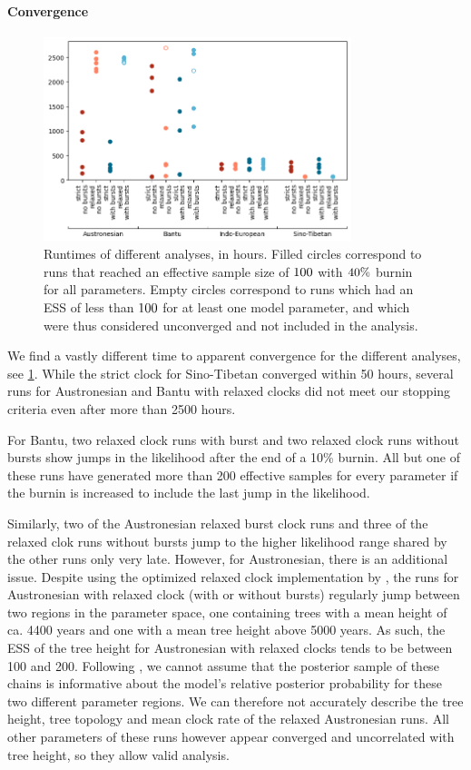 \documentclass[]{rsos}%
\begin{document}
\paragraph{Convergence}
\begin{figure}
  \centering
  \includegraphics[width=0.8\textwidth]{supplement/analysis/runtimes.png}
  \caption{Runtimes of different analyses, in hours. Filled circles correspond to runs that reached an effective sample size of $100$ with $40\%$ burnin for all parameters. Empty circles correspond to runs which had an ESS of less than $100$ for at least one model parameter, and which were thus considered unconverged and not included in the analysis.}\label{f:runtimes}
\end{figure}
We find a vastly different time to apparent convergence for the different
analyses, see \cref{f:runtimes}. While the strict clock for Sino-Tibetan converged within 50 hours,
several runs for Austronesian and Bantu with relaxed clocks did not meet our
stopping criteria even after more than 2500 hours.

For Bantu, two relaxed clock runs with burst and two relaxed clock runs without
bursts show jumps in the likelihood after the end of a 10\% burnin. All but one
of these runs have generated more than 200 effective samples for every parameter
if the burnin is increased to include the last jump in the likelihood.

Similarly, two of the Austronesian relaxed burst clock runs and three of the
relaxed clok runs without bursts jump to the higher likelihood range
shared by the other runs only very late.
However, for Austronesian, there is an additional issue.
Despite using the optimized relaxed clock
implementation by \textcite{orc}, the runs for Austronesian with relaxed clock
(with or without bursts) regularly jump between two regions in the parameter
space, one containing trees with a mean height of ca. 4400 years and one with a
mean tree height above 5000 years. As such, the ESS of the tree height for
Austronesian with relaxed clocks tends to
be between 100 and 200. Following \textcite{brown2018behavior}, we cannot
assume that the posterior sample of these chains is informative about the
model's relative posterior probability for these two different parameter regions.
We can therefore not accurately describe the tree height, tree topology and mean clock rate of
the relaxed Austronesian runs. All other parameters of these runs however appear
converged and uncorrelated with tree height, so they allow valid analysis.
\end{document}
